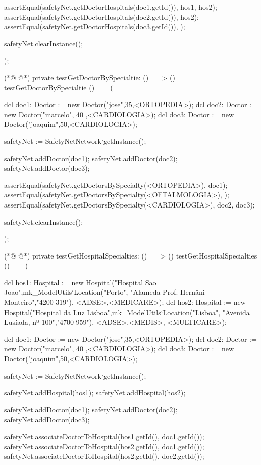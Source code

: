 \begin{vdmpp}[breaklines=true]
  assertEqual(safetyNet.getDoctorHospitals(doc1.getId()), {hos1, hos2});
  assertEqual(safetyNet.getDoctorHospitals(doc2.getId()), {hos2});
  assertEqual(safetyNet.getDoctorHospitals(doc3.getId()), {});  
  
  safetyNet.clearInstance();
    
);

(*@
\label{testGetDoctorBySpecialtie:444}
@*)
private testGetDoctorBySpecialtie: () ==> ()
 testGetDoctorBySpecialtie () == (
 
  dcl doc1: Doctor := new Doctor("jose",35,<ORTOPEDIA>);
  dcl doc2: Doctor := new Doctor("marcelo", 40 ,<CARDIOLOGIA>);
  dcl doc3: Doctor := new Doctor("joaquim",50,<CARDIOLOGIA>);
  
  safetyNet := SafetyNetNetwork`getInstance();
  
  safetyNet.addDoctor(doc1);
  safetyNet.addDoctor(doc2);
  safetyNet.addDoctor(doc3);

  assertEqual(safetyNet.getDoctorsBySpecialty(<ORTOPEDIA>), {doc1});
  assertEqual(safetyNet.getDoctorsBySpecialty(<OFTALMOLOGIA>), {});
  assertEqual(safetyNet.getDoctorsBySpecialty(<CARDIOLOGIA>), {doc2, doc3});  
  
  safetyNet.clearInstance();
    
);

(*@
\label{testGetHospitalSpecialties:465}
@*)
private testGetHospitalSpecialties: () ==> ()
 testGetHospitalSpecialties () == (
 
  dcl hos1: Hospital := new Hospital("Hospital Sao Joao",mk_ModelUtils`Location("Porto", "Alameda Prof. Hernâni Monteiro","4200-319"), {<ADSE>,<MEDICARE>});
  dcl hos2: Hospital := new Hospital("Hospital da Luz Lisboa",mk_ModelUtils`Location("Lisboa", "Avenida Lusíada, nº 100","4700-959"), {<ADSE>,<MEDIS>, <MULTICARE>});
  
  dcl doc1: Doctor := new Doctor("jose",35,<ORTOPEDIA>);
  dcl doc2: Doctor := new Doctor("marcelo", 40 ,<CARDIOLOGIA>);
  dcl doc3: Doctor := new Doctor("joaquim",50,<CARDIOLOGIA>);
  
  safetyNet := SafetyNetNetwork`getInstance();
   
  safetyNet.addHospital(hos1);
  safetyNet.addHospital(hos2);
  
  safetyNet.addDoctor(doc1);
  safetyNet.addDoctor(doc2);
  safetyNet.addDoctor(doc3);

  safetyNet.associateDoctorToHospital(hos1.getId(), doc1.getId());
  safetyNet.associateDoctorToHospital(hos2.getId(), doc1.getId());
  safetyNet.associateDoctorToHospital(hos2.getId(), doc2.getId());


\end{vdmpp}
